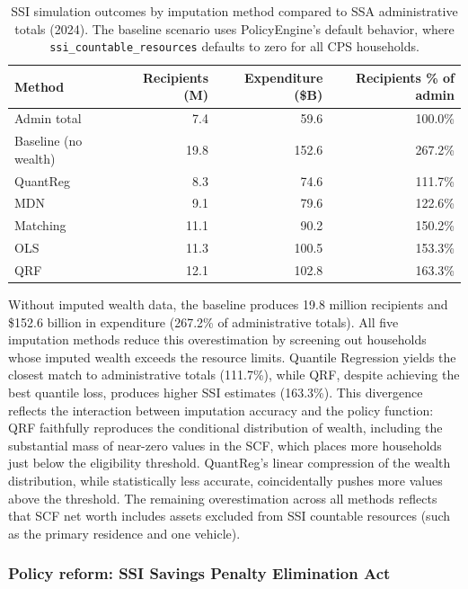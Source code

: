 \begin{table}[H]
    \centering
    \caption{SSI simulation outcomes by imputation method compared to SSA administrative totals (2024). The baseline scenario uses PolicyEngine's default behavior, where \texttt{ssi\_countable\_resources} defaults to zero for all CPS households.}
    \label{tab:ssi_results}
    \begin{tabular}{lrrr}
        \toprule
        Method & Recipients (M) & Expenditure (\$B) & Recipients \% of admin \\
        \midrule
        Admin total & 7.4 & 59.6 & 100.0\% \\
        Baseline (no wealth) & 19.8 & 152.6 & 267.2\% \\
        \midrule
        QuantReg & 8.3 & 74.6 & 111.7\% \\
        MDN & 9.1 & 79.6 & 122.6\% \\
        Matching & 11.1 & 90.2 & 150.2\% \\
        OLS & 11.3 & 100.5 & 153.3\% \\
        QRF & 12.1 & 102.8 & 163.3\% \\
        \bottomrule
    \end{tabular}
\end{table}

Without imputed wealth data, the baseline produces 19.8 million recipients and \$152.6 billion in expenditure (267.2\% of administrative totals). All five imputation methods reduce this overestimation by screening out households whose imputed wealth exceeds the resource limits. Quantile Regression yields the closest match to administrative totals (111.7\%), while QRF, despite achieving the best quantile loss, produces higher SSI estimates (163.3\%). This divergence reflects the interaction between imputation accuracy and the policy function: QRF faithfully reproduces the conditional distribution of wealth, including the substantial mass of near-zero values in the SCF, which places more households just below the eligibility threshold. QuantReg's linear compression of the wealth distribution, while statistically less accurate, coincidentally pushes more values above the threshold. The remaining overestimation across all methods reflects that SCF net worth includes assets excluded from SSI countable resources (such as the primary residence and one vehicle).

\subsubsection{Policy reform: SSI Savings Penalty Elimination Act}

